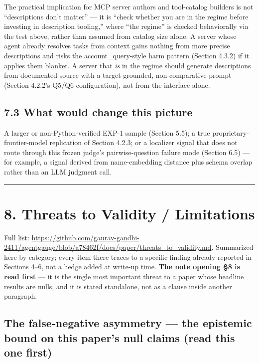The practical implication for MCP server authors and tool-catalog
builders is not ``descriptions don't matter'' --- it is ``check whether
you are in the regime before investing in description tooling,'' where
``the regime'' is checked behaviorally via the test above, rather than
assumed from catalog size alone. A server whose agent already resolves
tasks from context gains nothing from more precise descriptions and
risks the account\_query-style harm pattern (Section 4.3.2) if it
applies them blanket. A server that \emph{is} in the regime should
generate descriptions from documented source with a target-grounded,
non-comparative prompt (Section 4.2.2's Q5/Q6 configuration), not from
the interface alone.

\hypertarget{what-would-change-this-picture}{%
\subsection{7.3 What would change this
picture}\label{what-would-change-this-picture}}

A larger or non-Python-verified EXP-1 sample (Section 5.5); a true
proprietary-frontier-model replication of Section 4.2.3; or a localizer
signal that does not route through this frozen judge's pairwise-question
failure mode (Section 6.5) --- for example, a signal derived from
name-embedding distance plus schema overlap rather than an LLM judgment
call.

\begin{center}\rule{0.5\linewidth}{0.5pt}\end{center}

\hypertarget{threats-to-validity-limitations}{%
\section{8. Threats to Validity /
Limitations}\label{threats-to-validity-limitations}}

Full list:
\url{https://github.com/gaurav-gandhi-2411/agentgauge/blob/a78462f/docs/paper/threats_to_validity.md}.
Summarized here
by category; every item there traces to a specific finding already
reported in Sections 4--6, not a hedge added at write-up time.
\textbf{The note opening §8 is read first} --- it is the single most important threat
to a paper whose headline results are nulls, and it is stated
standalone, not as a clause inside another paragraph.

\hypertarget{the-false-negative-asymmetry-read-this-one-first}{%
\subsection{The false-negative asymmetry --- the epistemic bound on this
paper's null claims (read this one
first)}\label{the-false-negative-asymmetry-read-this-one-first}}

